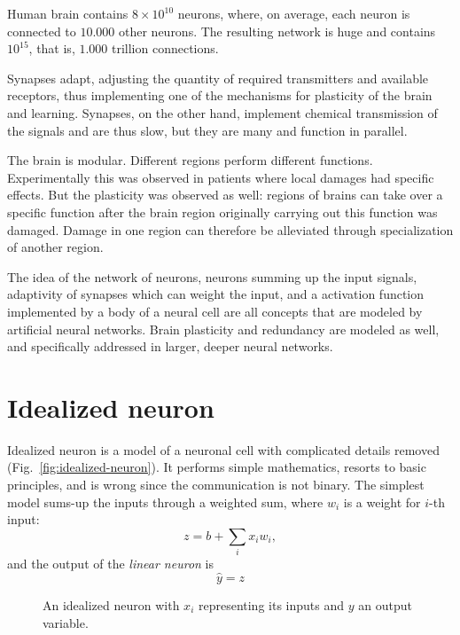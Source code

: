 \begin{refsection}
Human brain contains $8\times 10^{10}$ neurons, where, on average, each neuron is connected to $10.000$ other neurons. The resulting network is huge and contains $10^{15}$, that is, $1.000$ trillion connections. 

Synapses adapt, adjusting the quantity of required transmitters and available receptors, thus implementing one of the mechanisms for plasticity of the brain and learning. Synapses, on the other hand, implement chemical transmission of the signals and are thus slow, but they are many and function in parallel.

The brain is modular. Different regions perform different functions. Experimentally this was observed in patients where local damages had specific effects. But the plasticity was observed as well: regions of brains can take over a specific function after the brain region originally carrying out this function was damaged. Damage in one region can therefore be alleviated through specialization of another region.

The idea of the network of neurons, neurons summing up the input signals, adaptivity of synapses which can weight the input, and a activation function implemented by a body of a neural cell are all concepts that are modeled by artificial neural networks. Brain plasticity and redundancy are modeled as well, and specifically addressed in larger, deeper neural networks.

\section{Idealized neuron}

Idealized neuron is a model of a neuronal cell with complicated details removed (Fig.~\ref{fig:idealized-neuron}). It performs simple mathematics, resorts to basic principles, and is wrong since the communication is not binary. The simplest model sums-up the inputs through a weighted sum, where $w_i$ is a weight for $i$-th input:
\begin{equation}
z = b + \sum_i x_i w_i,
\end{equation}
and the output of the {\em linear neuron} is
\begin{equation}
\hat{y} = z
\end{equation}

\begin{figure}
\caption{An idealized neuron with $x_i$ representing its inputs and $y$ an output variable.}
\label{fig:neural-cell}
\end{figure}


\end{refsection}
